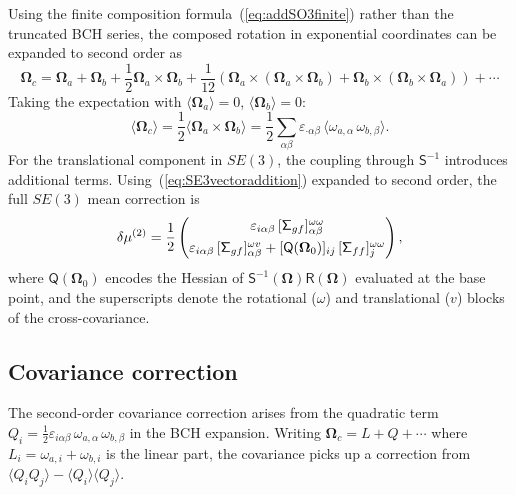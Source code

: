 \documentclass[journal]{IEEEtran}
\newcommand{\bfOmega}{\boldsymbol{\Omega}}
\newcommand{\sfSigma}[1]{\mathsf{\Sigma}_\mathnormal{#1}}
\newcommand{\beq}{\begin{equation}}
\newcommand{\eeq}{\end{equation}}
\begin{document}
Using the finite composition formula~(\ref{eq:addSO3finite}) rather than 
the truncated BCH series, the composed rotation in exponential coordinates 
can be expanded to second order as
\beq
    \bfOmega_c = \bfOmega_a + \bfOmega_b + \frac{1}{2}\bfOmega_a \times \bfOmega_b
    + \frac{1}{12}\left(\bfOmega_a \times (\bfOmega_a \times \bfOmega_b) 
    + \bfOmega_b \times (\bfOmega_b \times \bfOmega_a)\right) + \cdots
    \label{eq:BCHexpanded}
\eeq
Taking the expectation with $\langle \bfOmega_a \rangle = 0$, 
$\langle \bfOmega_b \rangle = 0$:
\beq
    \langle \bfOmega_c \rangle = \frac{1}{2}\langle \bfOmega_a \times \bfOmega_b \rangle
    = \frac{1}{2} \sum_{\alpha\beta} \varepsilon_{\cdot\alpha\beta}\, 
    \langle \omega_{a,\alpha}\, \omega_{b,\beta} \rangle.
    \label{eq:meanshift_rotation}
\eeq
For the translational component in $SE(3)$, the coupling through $\mathsf{S}^{-1}$ 
introduces additional terms. Using~(\ref{eq:SE3vectoraddition}) expanded to second order,
the full $SE(3)$ mean correction is
\beq
    \delta\mu^{(2)} = \frac{1}{2}
    \begin{pmatrix}
    \varepsilon_{i\alpha\beta}\, [\sfSigma{gf}]_{\alpha\beta}^{\omega\omega} \\[4pt]
    \varepsilon_{i\alpha\beta}\, [\sfSigma{gf}]_{\alpha\beta}^{\omega v}
    + [\mathsf{Q}(\bfOmega_0)]_{ij}\, [\sfSigma{ff}]_{j}^{\omega\omega}
    \end{pmatrix},
    \label{eq:fullmeancorrection}
\eeq
where $\mathsf{Q}(\bfOmega_0)$ encodes the Hessian of $\mathsf{S}^{-1}(\bfOmega)\mathsf{R}(\bfOmega)$
evaluated at the base point, and the superscripts denote the rotational ($\omega$) 
and translational ($v$) blocks of the cross-covariance.

\subsection{Covariance correction}

The second-order covariance correction arises from the 
quadratic term $Q_i = \frac{1}{2}\varepsilon_{i\alpha\beta}\,
\omega_{a,\alpha}\,\omega_{b,\beta}$ in the BCH expansion.
Writing $\bfOmega_c = L + Q + \cdots$ where 
$L_i = \omega_{a,i} + \omega_{b,i}$ is the linear part, 
the covariance picks up a correction from 
$\langle Q_i Q_j \rangle - \langle Q_i \rangle \langle Q_j \rangle$.
\end{document}
